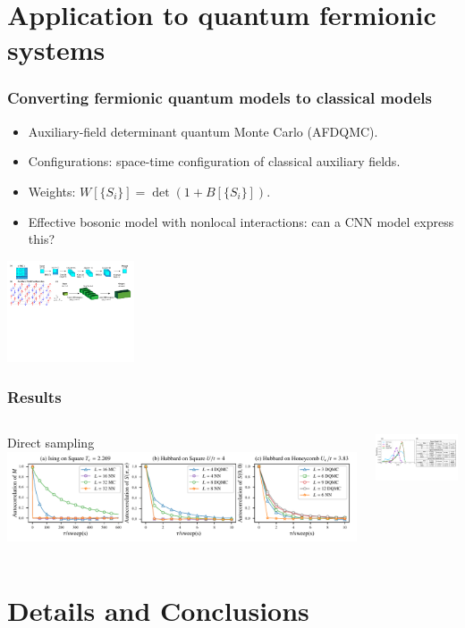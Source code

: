 \documentclass[xcolor=table, 10pt, aspectratio=169, ignorenonframetext]{beamer}
\begin{document}
\section{Application to quantum fermionic systems}

\begin{frame}
	\frametitle{Converting fermionic quantum models to classical models}
	\begin{itemize}
		\item Auxiliary-field determinant quantum Monte Carlo (AFDQMC).
		\item Configurations: space-time configuration of classical auxiliary fields.
		\item Weights: $W[\{S_i\}] = \det (1 + B[\{S_i\}])$.
		\item Effective bosonic model with nonlocal interactions: can a CNN model express this?
	\end{itemize}
	\begin{center}
		\includegraphics[height=3cm]{nn-model2}
	\end{center}
\end{frame}

\begin{frame}
	\frametitle{Results}
	\begin{columns}
		\begin{center}
			Direct sampling
			\includegraphics{autocorr-c}
		\end{center}
		\begin{center}
			\includegraphics[width=7cm]{corr-2}
		\end{center}

	\end{columns}
\end{frame}

\section{Details and Conclusions}
\end{document}
